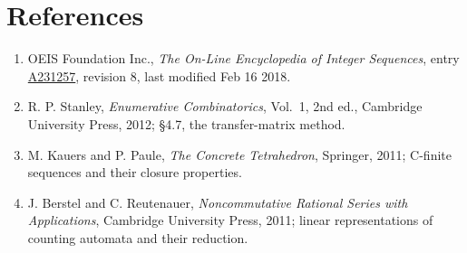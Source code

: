 \documentclass[11pt]{article}
\theoremstyle{definition}
\begin{document}
\section{References}

\begin{enumerate}

\item OEIS Foundation Inc., \emph{The On-Line Encyclopedia of Integer Sequences}, entry \href{https://oeis.org/A231257}{A231257}, revision 8, last modified Feb 16 2018.

\item R. P. Stanley, \emph{Enumerative Combinatorics}, Vol.~1, 2nd ed., Cambridge University Press, 2012; \S4.7, the transfer-matrix method.

\item M. Kauers and P. Paule, \emph{The Concrete Tetrahedron}, Springer, 2011; C-finite sequences and their closure properties.

\item J. Berstel and C. Reutenauer, \emph{Noncommutative Rational Series with Applications}, Cambridge University Press, 2011; linear representations of counting automata and their reduction.

\end{enumerate}
\end{document}
